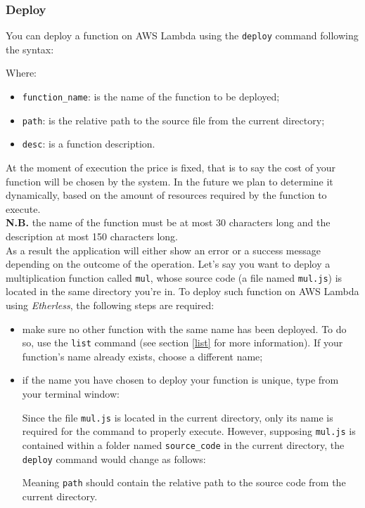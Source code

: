 \subsubsection{Deploy}\label{deploy}
You can deploy a function on AWS Lambda using the \texttt{deploy} command following the syntax:
\begin{center}
\end{center}
\noindent Where:
\begin{itemize}
	\item \texttt{function\_name}: is the name of the function to be deployed;
	\item \texttt{path}: is the relative path to the source file from the current directory;
	\item \texttt{desc}: is a function description.
\end{itemize}
At the moment of execution the price is fixed, that is to say the cost of your function will be chosen by the system. In the future we plan to determine it dynamically, based on the amount of resources required by the function to execute. \\
\textbf{N.B.} the name of the function must be at most 30 characters long and the description at most 150 characters long. \\
As a result the application will either show an error or a success message depending on the outcome of the operation.
Let's say you want to deploy a multiplication function called \texttt{mul}, whose source code (a file named \texttt{mul.js}) is located in the same directory you're in. To deploy such function on AWS Lambda using \textit{Etherless}, the following steps are required:
\begin{itemize}
\item make sure no other function with the same name has been deployed. To do so, use the \texttt{list} command (see section \ref{list} for more information). If your function's name already exists, choose a different name;
\item if the name you have chosen to deploy your function is unique, type from your terminal window:
\begin{center}
\end{center}
Since the file \texttt{mul.js} is located in the current directory, only its name is required for the command to properly execute. However, supposing \texttt{mul.js} is contained within a folder named \texttt{source\_code} in the current directory, the \texttt{deploy} command would change as follows:
\begin{center}
\end{center}
Meaning \texttt{path} should contain the relative path to the source code from the current directory.
\end{itemize}

